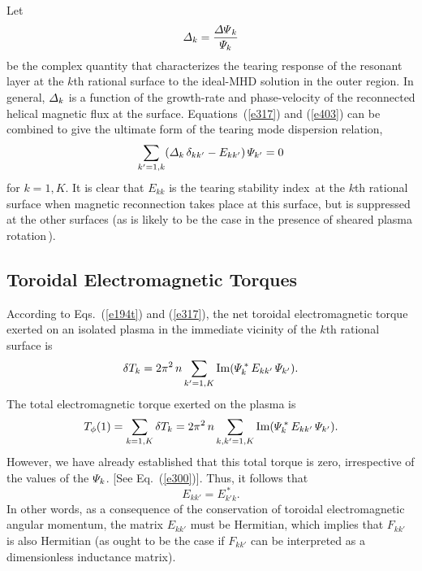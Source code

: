 \documentclass[12pt,prb,aps]{revtex4-1}
\begin{document}
Let
\begin{equation}\label{e403}
{\mit\Delta}_k = \frac{{\mit\Delta\Psi}_k}{{\mit\Psi}_k}
\end{equation}
 be the complex quantity that characterizes the
tearing response of the resonant layer at the $k$th rational surface to the ideal-MHD solution in the outer region.\cite{fkr}
In general, ${\mit\Delta}_k$ is a function of the growth-rate and phase-velocity of the reconnected helical magnetic flux at the surface.\cite{am1,layer,layer1}
Equations~(\ref{e317}) and (\ref{e403})  can be combined to give the ultimate form of the  tearing mode dispersion relation,
\begin{equation}\label{e317u}
\sum_{k'=1,k}({\mit\Delta}_k\,\delta_{kk'}-E_{kk'})\,{\mit\Psi}_{k'} = 0
\end{equation}
for $k=1,K$.  It is clear that $E_{kk}$ is the tearing stability index\,\cite{fkr} at the $k$th rational surface when magnetic reconnection  takes place
at this surface, but is suppressed at the other surfaces (as is likely to be the case in the presence of sheared plasma rotation\,\cite{am1}). 

\subsection{Toroidal Electromagnetic Torques}\label{etor}
According to Eqs.~(\ref{e194t}) and (\ref{e317}), the net toroidal electromagnetic torque exerted on an isolated plasma
in the immediate vicinity of the $k$th rational surface is
\begin{equation}\label{e405}
\delta T_k = 2\pi^2\,n\sum_{k'=1,K} {\rm Im}({\mit\Psi}_k^{\,\ast}\,E_{kk'}\,{\mit\Psi}_{k'}).
\end{equation}
The total electromagnetic torque exerted on the plasma is
\begin{equation}
T_\phi(1) = \sum_{k=1,K}\delta T_k =  2\pi^2\,n\sum_{k,k'=1,K} {\rm Im}({\mit\Psi}_k^{\,\ast}\,E_{kk'}\,{\mit\Psi}_{k'}).
\end{equation}
However, we have already established that this total torque is zero, irrespective of the values of the ${\mit\Psi}_k$. [See Eq.~(\ref{e300})].
Thus, it follows that
\begin{equation}
E_{kk'} = E_{k'k}^{\,\ast}.
\end{equation}
In other words, as a
consequence of the conservation of toroidal electromagnetic angular momentum, the matrix $E_{kk'}$ must be Hermitian,\cite{am1} which implies that $F_{kk'}$ is also Hermitian (as ought to be the case if $F_{kk'}$ can
be interpreted as 
a dimensionless inductance matrix). 
\end{document}
